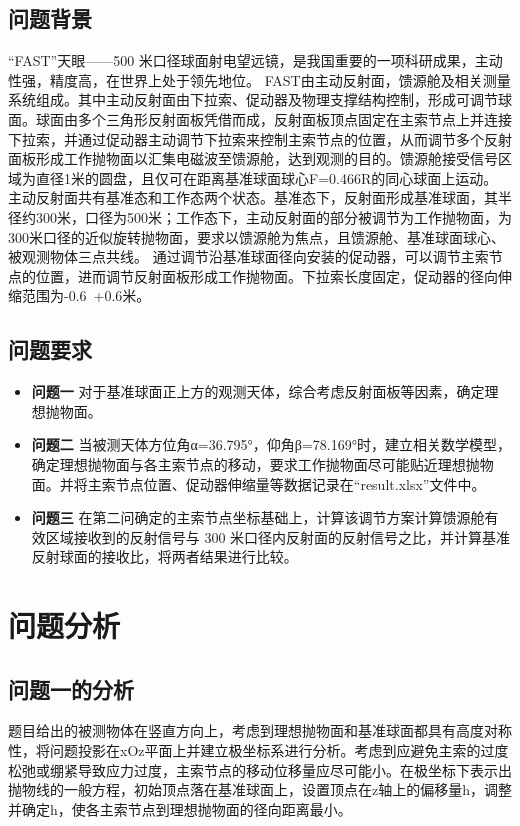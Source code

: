 \documentclass[withoutpreface,bwprint]{cumcmthesis} %
\begin{document}
		\subsection{问题背景}
		“FAST”天眼——500 米口径球面射电望远镜，是我国重要的一项科研成果，主动性强，精度高，在世界上处于领先地位。
		FAST由主动反射面，馈源舱及相关测量系统组成。其中主动反射面由下拉索、促动器及物理支撑结构控制，形成可调节球面。球面由多个三角形反射面板凭借而成，反射面板顶点固定在主索节点上并连接下拉索，并通过促动器主动调节下拉索来控制主索节点的位置，从而调节多个反射面板形成工作抛物面以汇集电磁波至馈源舱，达到观测的目的。馈源舱接受信号区域为直径1米的圆盘，且仅可在距离基准球面球心F=0.466R的同心球面上运动。
		主动反射面共有基准态和工作态两个状态。基准态下，反射面形成基准球面，其半径约300米，口径为500米；工作态下，主动反射面的部分被调节为工作抛物面，为300米口径的近似旋转抛物面，要求以馈源舱为焦点，且馈源舱、基准球面球心、被观测物体三点共线。
		通过调节沿基准球面径向安装的促动器，可以调节主索节点的位置，进而调节反射面板形成工作抛物面。下拉索长度固定，促动器的径向伸缩范围为-0.6~+0.6米。
		\subsection{问题要求}
		\begin{itemize}
	\item \textbf{问题一}  \quad 对于基准球面正上方的观测天体，综合考虑反射面板等因素，确定理想抛物面。
	\item \textbf{问题二}  \quad 当被测天体方位角α=36.795°，仰角β=78.169°时，建立相关数学模型，确定理想抛物面与各主索节点的移动，要求工作抛物面尽可能贴近理想抛物面。并将主索节点位置、促动器伸缩量等数据记录在“result.xlsx”文件中。
	\item \textbf{问题三} \quad 在第二问确定的主索节点坐标基础上，计算该调节方案计算馈源舱有效区域接收到的反射信号与 300 米口径内反射面的反射信号之比，并计算基准反射球面的接收比，将两者结果进行比较。
\end{itemize}
	
	
	\section{问题分析}
		\subsection{问题一的分析}
	题目给出的被测物体在竖直方向上，考虑到理想抛物面和基准球面都具有高度对称性，将问题投影在xOz平面上并建立极坐标系进行分析。考虑到应避免主索的过度松弛或绷紧导致应力过度，主索节点的移动位移量应尽可能小。在极坐标下表示出抛物线的一般方程，初始顶点落在基准球面上，设置顶点在z轴上的偏移量h，调整并确定h，使各主索节点到理想抛物面的径向距离最小。
	
\end{document}

